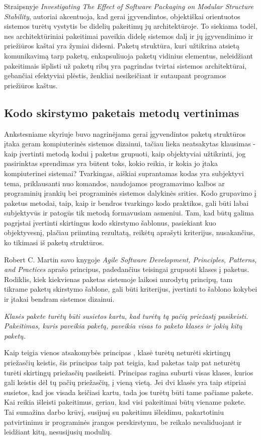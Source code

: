 Straipsnyje \textit{Investigating The Effect of Software Packaging on Modular Structure Stability}, autoriai akcentuoja, kad
gerai įgyvendintos, objektiškai orientuotos sistemos turėtų vystytis be didelių pakeitimų jų architektūroje.
To siekiama todėl, nes architektūriniai pakeitimai paveikia didelę sistemos dalį ir
jų įgyvendinimo ir priežiūros kaštai yra žymiai didesni\cite{ModularStability}.
Paketų struktūra, kuri užtikrina atsietą  komunikavimą tarp paketų, enkapsuliuoja paketų vidinius elementus, neleidžiant pakeitimais
išplisti už paketų ribų yra pagrindas tvirtai sistemos architektūrai, gebančiai efektyviai plėstis, ženkliai nesikeičiant ir sutaupant programos priežiūros kaštus.

\subsection{Kodo skirstymo paketais metodų vertinimas}
Ankstesniame skyriuje buvo nagrinėjama gerai įgyvendintos paketų struktūros įtaka geram kompiuterinės sistemos dizainui,
tačiau lieka neatsakytas klausimas - kaip įvertinti metodą kodui į paketus grupuoti, kaip objektyviai užtikrinti,
jog pasirinktas sprendimas yra būtent toks, kokio reikia, ir kokia jo įtaka kompiuterinei sistemai?
Tvarkingas, aiškiai suprantamas kodas yra subjektyvi tema, priklausanti nuo komandos,
naudojamos programavimo kalbos ar programinių įrankių bei programinės sistemos dalykinės srities.
Kodo grupavimo į paketus metodai, taip, kaip ir bendros tvarkingo kodo praktikos,
gali būti labai subjektyvūs ir patogūs tik metodą formavusiam asmeniui.
Tam, kad būtų galima pagrįstai įvertinti skirtingus kodo skirstymo šablonus, pasiekiant kuo objektyvesnį,
plačiau priimtiną rezultatą, reikėtų aprašyti kriterijus, nusakančius, ko tikimasi iš paketų struktūros.

Robert C. Martin savo knygoje \textit{Agile Software Development, Principles, Patterns, and Practices} aprašo
principus, padedančius teisingai grupuoti klases į paketus.
Rodiklis, kiek kiekvienas paketas sistemoje laikosi nurodytų principų, tam tikrame paketų skirstymo šablone, gali
būti kriterijus, įvertinti to šablono kokybei ir įtakai bendram sistemos dizainui.

\textit{Klasės pakete turėtų būti susietos kartu, kad turėtų tą pačią priežastį pasikeisti. Pakeitimas,
kuris paveikia paketą, paveikia visas to paketo klases ir jokių kitų paketų.}

Kaip teigia vienos atsakomybės principas , klasė turėtų neturėti skirtingų priežasčių keistis,
šis principas taip pat teigia, kad paketas taip pat neturėtų turėti skirtingų priežasčių pasikeisti.
Principas ragina suburti visas klases, kurios gali keistis dėl tų pačių priežasčių, į vieną vietą.
Jei dvi klasės yra taip stipriai susietos, kad jos visada keičiasi kartu, tada
jos turėtų būti tame pačiame pakete.
Kai reikia išleisti pakeitimus, geriau, kad visi pakeitimai būtų viename pakete.
Tai sumažina darbo krūvį, susijusį su pakeitimu išleidimu, pakartotiniu patvirtinimu ir programinės įrangos perskirstymu,
be reikalo nevaliduojant ir leidžiant kitų, nesusijusių modulių\cite{AgileSoftwareDevelopment}.

